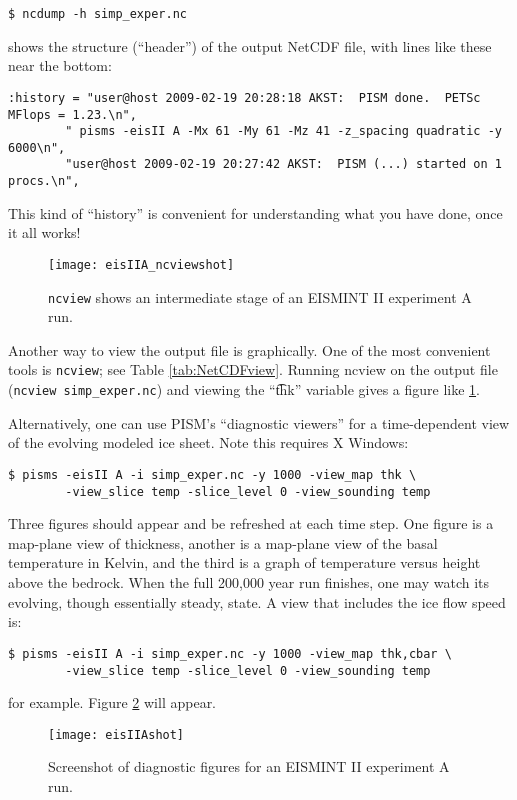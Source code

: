 \verb|$ ncdump -h simp_exper.nc|

\noindent shows the structure (``header'') of the output NetCDF file, with lines like these near the bottom:
\small
\begin{verbatim}
:history = "user@host 2009-02-19 20:28:18 AKST:  PISM done.  PETSc MFlops = 1.23.\n",
        " pisms -eisII A -Mx 61 -My 61 -Mz 41 -z_spacing quadratic -y 6000\n",
        "user@host 2009-02-19 20:27:42 AKST:  PISM (...) started on 1 procs.\n",
\end{verbatim}
\normalsize
\noindent This kind of ``history'' is convenient for understanding what you have done, once it all works!

\begin{figure}[ht]
\texttt{[image: eisIIA\_ncviewshot]}
\caption{\texttt{ncview} shows an intermediate stage of an EISMINT II experiment A run.}
\label{fig:ncviewshot}
\end{figure}

Another way to view the output file is graphically.  One of the most convenient tools is \verb|ncview|; see Table \ref{tab:NetCDFview}.  Running ncview on the output file (\verb|ncview simp_exper.nc|) and viewing the ``\t{thk}'' variable gives a figure like \ref{fig:ncviewshot}.

Alternatively, one can use PISM's ``diagnostic viewers'' for a time-dependent view of the evolving modeled ice sheet.  Note this requires X Windows:

\begin{verbatim}
$ pisms -eisII A -i simp_exper.nc -y 1000 -view_map thk \
        -view_slice temp -slice_level 0 -view_sounding temp
\end{verbatim}
Three figures should appear and be refreshed at each time step.  One figure is a map-plane view of thickness, another is a map-plane view of the basal temperature in Kelvin, and the third is a graph of temperature versus height above the bedrock.  When the full 200,000 year run finishes, one may watch its evolving, though essentially steady, state.  A view that includes the ice flow speed is:
\begin{verbatim}
$ pisms -eisII A -i simp_exper.nc -y 1000 -view_map thk,cbar \
        -view_slice temp -slice_level 0 -view_sounding temp
\end{verbatim}
for example.  Figure \ref{fig:screenshot} will appear.

\begin{figure}[ht]
\texttt{[image: eisIIAshot]}
\caption{Screenshot of diagnostic figures for an EISMINT II experiment A run.}
\label{fig:screenshot}
\end{figure}

